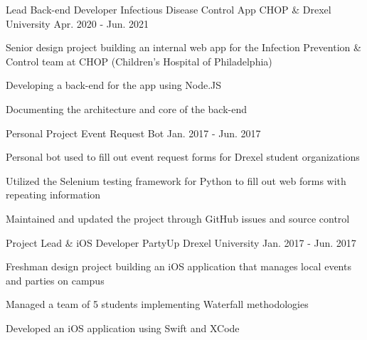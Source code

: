 

\begin{cventries}

  \cventry
    {Lead Back-end Developer} %
    {Infectious Disease Control App} %
    {CHOP \& Drexel University} %
    {Apr. 2020 - Jun. 2021} %
    {
      \begin{cvitems} %
        \item Senior design project building an internal web app for the Infection Prevention \& Control team at CHOP (Children's Hospital of Philadelphia)
        \item Developing a back-end for the app using Node.JS
        \item Documenting the architecture and core of the back-end
      \end{cvitems}
    }

  \cventry
    {Personal Project} %
    {Event Request Bot} %
    {} %
    {Jan. 2017 - Jun. 2017} %
    {
      \begin{cvitems} %
        \item Personal bot used to fill out event request forms for Drexel student organizations
        \item Utilized the Selenium testing framework for Python to fill out web forms with repeating information
        \item Maintained and updated the project through GitHub issues and source control
      \end{cvitems}
    }

  \cventry
    {Project Lead \& iOS Developer} %
    {PartyUp} %
    {Drexel University} %
    {Jan. 2017 - Jun. 2017} %
    {
      \begin{cvitems} %
        \item Freshman design project building an iOS application that manages local events and parties on campus
        \item Managed a team of 5 students implementing Waterfall methodologies
        \item Developed an iOS application using Swift and XCode
      \end{cvitems}
    }

\end{cventries}
